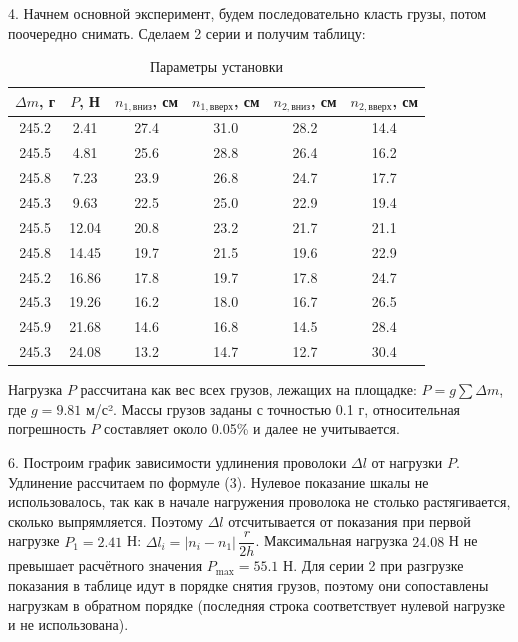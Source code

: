 \documentclass[12pt,a4paper]{article}
\begin{document}
4. Начнем основной эксперимент, будем последовательно класть грузы, потом поочередно снимать. Сделаем 2 серии и получим таблицу:
\begin{table}[H]
    \centering
    \caption{Параметры установки}
    \label{tab:params}
    \begin{tabular}{|c|c|c|c|c|c|}
        \hline
        $\Delta m$, г & $P$, Н & $n_{1,\text{вниз}}$, см & $n_{1,\text{вверх}}$, см & $n_{2,\text{вниз}}$, см & $n_{2,\text{вверх}}$, см \\
        \hline
        245.2 & 2.41 & 27.4 & 31.0 & 28.2 & 14.4 \\
        \hline
        245.5 & 4.81 & 25.6 & 28.8 & 26.4 & 16.2 \\
        \hline
        245.8 & 7.23 & 23.9 & 26.8 & 24.7 & 17.7 \\
        \hline
        245.3 & 9.63 & 22.5 & 25.0 & 22.9 & 19.4 \\
        \hline
        245.5 & 12.04 & 20.8 & 23.2 & 21.7 & 21.1 \\
        \hline
        245.8 & 14.45 & 19.7 & 21.5 & 19.6 & 22.9 \\
        \hline
        245.2 & 16.86 & 17.8 & 19.7 & 17.8 & 24.7 \\
        \hline
        245.3 & 19.26 & 16.2 & 18.0 & 16.7 & 26.5 \\
        \hline
        245.9 & 21.68 & 14.6 & 16.8 & 14.5 & 28.4 \\
        \hline
        245.3 & 24.08 & 13.2 & 14.7 & 12.7 & 30.4 \\
        \hline
    \end{tabular}
\end{table}
Нагрузка $P$ рассчитана как вес всех грузов, лежащих на площадке: $P = g\sum \Delta m$, где $g = 9.81$ м/с². Массы грузов заданы с точностью 0.1 г, относительная погрешность $P$ составляет около 0.05\% и далее не учитывается.

6. Построим график зависимости удлинения проволоки $\Delta l$ от нагрузки $P$. Удлинение рассчитаем по формуле (3). Нулевое показание шкалы не использовалось, так как в начале нагружения проволока не столько растягивается, сколько выпрямляется. Поэтому $\Delta l$ отсчитывается от показания при первой нагрузке $P_1 = 2.41$ Н: $\Delta l_i = |n_i - n_1|\,\dfrac{r}{2h}$. Максимальная нагрузка $24.08$ Н не превышает расчётного значения $P_{\text{max}} = 55.1$ Н. Для серии 2 при разгрузке показания в таблице идут в порядке снятия грузов, поэтому они сопоставлены нагрузкам в обратном порядке (последняя строка соответствует нулевой нагрузке и не использована).
\end{document}
